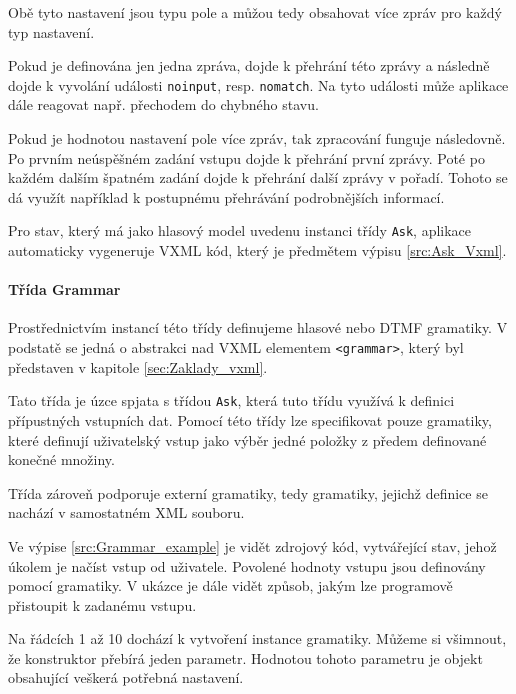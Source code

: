 \documentclass[ing,male,java,dept460,twoside]{diploma}						%
\begin{document}
Obě tyto nastavení jsou typu pole a můžou tedy obsahovat více zpráv pro každý typ nastavení.

Pokud je definována jen jedna zpráva, dojde k přehrání této zprávy a následně dojde k vyvolání události \texttt{noinput}, resp. \texttt{nomatch}. Na tyto události může aplikace dále reagovat např. přechodem do chybného stavu.

Pokud je hodnotou nastavení pole více zpráv, tak zpracování funguje následovně. Po prvním neúspěšném zadání vstupu dojde k přehrání první zprávy. Poté po každém dalším špatném zadání dojde k přehrání další zprávy v pořadí. Tohoto se dá využít například k postupnému přehrávání podrobnějších informací.

Pro stav, který má jako hlasový model uvedenu instanci třídy \texttt{Ask}, aplikace automaticky vygeneruje VXML kód, který je předmětem výpisu \ref{src:Ask_Vxml}.



\paragraph{Třída Grammar}
\label{sec:Grammar}
Prostřednictvím instancí této třídy definujeme hlasové nebo DTMF gramatiky. V podstatě se jedná o abstrakci nad VXML elementem \texttt{<grammar>}, který byl představen v kapitole \ref{sec:Zaklady_vxml}.

Tato třída je úzce spjata s třídou \texttt{Ask}, která tuto třídu využívá k definici přípustných vstupních dat. Pomocí této třídy lze specifikovat pouze gramatiky, které definují uživatelský vstup jako výběr jedné položky z předem definované konečné množiny.

Třída zároveň podporuje externí gramatiky, tedy gramatiky, jejichž definice se nachází v samostatném XML souboru.

Ve výpise \ref{src:Grammar_example} je vidět zdrojový kód, vytvářející stav, jehož úkolem je načíst vstup od uživatele. Povolené hodnoty vstupu jsou definovány pomocí gramatiky. V ukázce je dále vidět způsob, jakým lze programově přistoupit k zadanému vstupu.



Na řádcích 1 až 10 dochází k vytvoření instance gramatiky. Můžeme si všimnout, že konstruktor přebírá jeden parametr. Hodnotou tohoto parametru je objekt obsahující veškerá potřebná nastavení.
\end{document}
